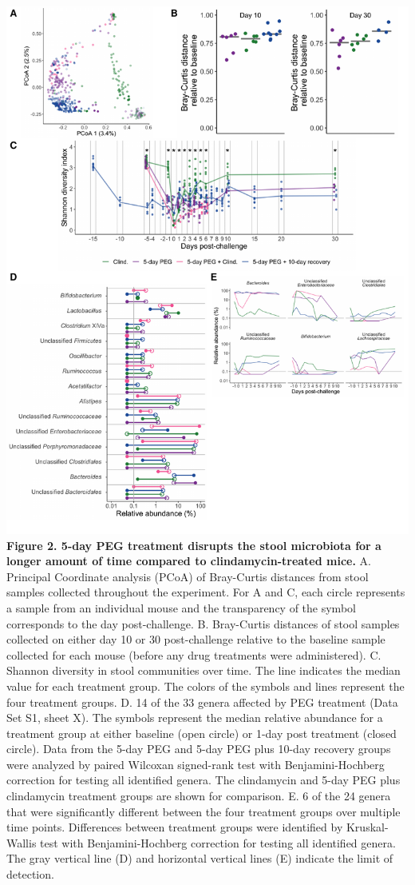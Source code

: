 \documentclass[
  11pt,
]{article}
\begin{document}
\includegraphics{figure_2.pdf} \textbf{Figure 2. 5-day PEG treatment
disrupts the stool microbiota for a longer amount of time compared to
clindamycin-treated mice.} A. Principal Coordinate analysis (PCoA) of
Bray-Curtis distances from stool samples collected throughout the
experiment. For A and C, each circle represents a sample from an
individual mouse and the transparency of the symbol corresponds to the
day post-challenge. B. Bray-Curtis distances of stool samples collected
on either day 10 or 30 post-challenge relative to the baseline sample
collected for each mouse (before any drug treatments were administered).
C. Shannon diversity in stool communities over time. The line indicates
the median value for each treatment group. The colors of the symbols and
lines represent the four treatment groups. D. 14 of the 33 genera
affected by PEG treatment (Data Set S1, sheet X). The symbols represent
the median relative abundance for a treatment group at either baseline
(open circle) or 1-day post treatment (closed circle). Data from the
5-day PEG and 5-day PEG plus 10-day recovery groups were analyzed by
paired Wilcoxan signed-rank test with Benjamini-Hochberg correction for
testing all identified genera. The clindamycin and 5-day PEG plus
clindamycin treatment groups are shown for comparison. E. 6 of the 24
genera that were significantly different between the four treatment
groups over multiple time points. Differences between treatment groups
were identified by Kruskal-Wallis test with Benjamini-Hochberg
correction for testing all identified genera. The gray vertical line (D)
and horizontal vertical lines (E) indicate the limit of detection.
\newpage
\end{document}
